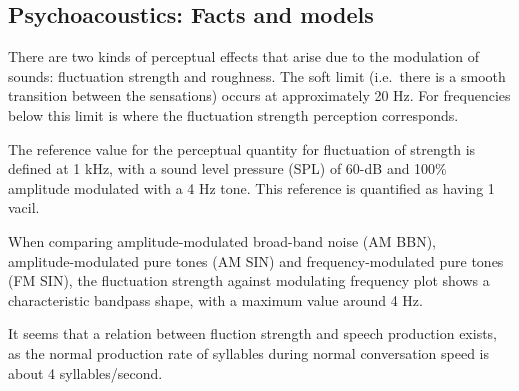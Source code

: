 \documentclass[a4paper]{report}
\begin{document}
\subsection{Psychoacoustics: Facts and models}

There are two kinds of perceptual effects that arise due to the modulation of
sounds: fluctuation strength and roughness. The soft limit (i.e.\ there is a
smooth transition between the sensations) occurs at approximately 20 Hz. For
frequencies below this limit is where the fluctuation strength perception
corresponds.

The reference value for the perceptual quantity for fluctuation of strength is
defined at 1 kHz, with a sound level pressure (SPL) of 60-dB and 100\% amplitude
modulated with a 4 Hz tone. This reference is quantified as having 1 vacil.

When comparing amplitude-modulated broad-band noise (AM BBN), \\
amplitude-modulated pure tones (AM SIN) and frequency-modulated pure tones
(FM SIN), the fluctuation strength against modulating frequency plot shows a
characteristic bandpass shape, with a maximum value around 4 Hz.

It seems that a relation between fluction strength and speech production exists,
as the normal production rate of syllables during normal conversation speed is
about 4 syllables/second.



\end{document}
